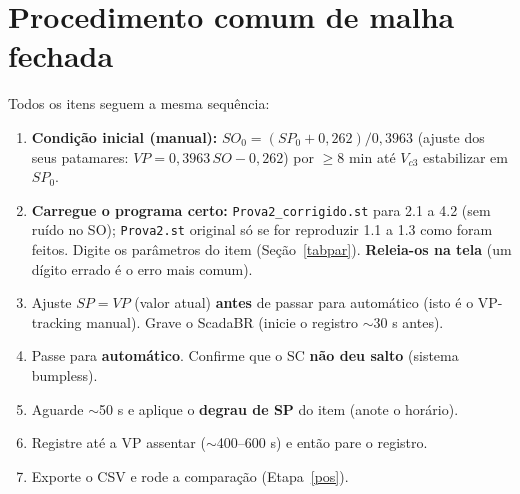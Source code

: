 \documentclass[11pt,a4paper]{article}
\newcommand{\Vc}[1]{V_{c#1}}
\begin{document}
\section{Procedimento comum de malha fechada}\label{comum}
Todos os itens seguem a mesma sequência:
\begin{enumerate}
\item \textbf{Condição inicial (manual):} $SO_0=(SP_0+0{,}262)/0{,}3963$ (ajuste dos seus patamares: $VP=0{,}3963\,SO-0{,}262$) por $\ge8$ min até $\Vc3$ estabilizar em $SP_0$.
\item \textbf{Carregue o programa certo:} \texttt{Prova2\_corrigido.st} para 2.1 a 4.2 (sem ruído no SO); \texttt{Prova2.st} original só se for reproduzir 1.1 a 1.3 como foram feitos. Digite os parâmetros do item (Seção~\ref{tabpar}). \textbf{Releia-os na tela} (um dígito errado é o erro mais comum).
\item Ajuste $SP=VP$ (valor atual) \textbf{antes} de passar para automático (isto é o VP-tracking manual). Grave o ScadaBR (inicie o registro $\sim$30 s antes).
\item Passe para \textbf{automático}. Confirme que o SC \textbf{não deu salto} (sistema bumpless).
\item Aguarde $\sim$50 s e aplique o \textbf{degrau de SP} do item (anote o horário).
\item Registre até a VP assentar ($\sim$400--600 s) e então pare o registro.
\item Exporte o CSV e rode a comparação (Etapa~\ref{pos}).
\end{enumerate}

\end{document}
